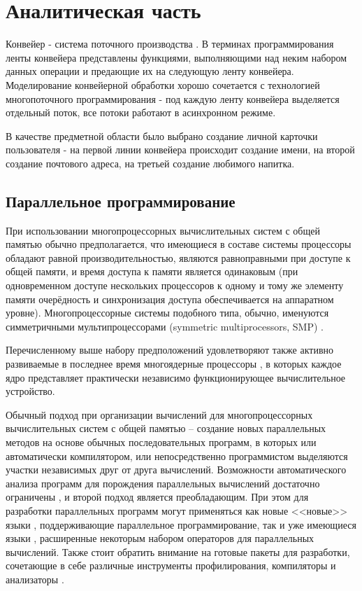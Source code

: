 \chapter{Аналитическая часть}

Конвейер - система поточного производства \cite{mednov}. В терминах программирования ленты конвейера представлены функциями, выполняющими над неким набором данных операции и предающие их на следующую ленту конвейера. Моделирование конвейерной обработки хорошо сочетается с технологией многопоточного программирования - под каждую ленту конвейера выделяется отдельный поток, все потоки работают в асинхронном режиме.

В качестве предметной области было выбрано создание личной карточки пользователя - на первой линии конвейера происходит создание имени, на второй создание почтового адреса, на третьей создание любимого напитка.


\section{Параллельное программирование}


При использовании многопроцессорных вычислительных систем с общей памятью \cite{smpbase} обычно предполагается, что имеющиеся в составе системы процессоры обладают равной производительностью, являются равноправными при доступе к общей памяти, и время доступа к памяти является одинаковым (при одновременном доступе нескольких процессоров к одному и тому же элементу памяти очерёдность и синхронизация доступа обеспечивается на аппаратном уровне). Многопроцессорные системы подобного типа, обычно, именуются симметричными мультипроцессорами ({\ttfamily symmetric multiprocessors, SMP}) \cite{smp}.


Перечисленному выше набору предположений удовлетворяют также активно развиваемые в последнее время многоядерные процессоры \cite{vliw}, в которых каждое ядро представляет практически независимо функционирующее вычислительное устройство.


Обычный подход при организации вычислений для многопроцессорных вычислительных систем с общей памятью – создание новых параллельных методов на основе обычных последовательных программ, в которых или автоматически компилятором, или непосредственно программистом выделяются участки независимых друг от друга вычислений. Возможности автоматического анализа программ для порождения параллельных вычислений достаточно ограничены \cite{anallimits}, и второй подход является преобладающим. При этом для разработки параллельных программ могут применяться как новые <<новые>> языки \cite{f}, поддерживающие параллельное программирование, так и уже имеющиеся языки \cite{golang}, расширенные некоторым набором операторов для параллельных вычислений. Также стоит обратить внимание на готовые пакеты для разработки, сочетающие в себе различные инструменты профилирования, компиляторы и анализаторы \cite{intelXE}.


